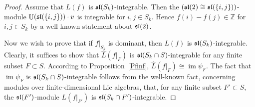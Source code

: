 \documentclass[10pt]{amsart}\oddsidemargin -1mm \evensidemargin -1mm \topmargin -15mm\headheight5mm \headsep 3.5mm \textheight 245mm\textwidth 170mm %
\theoremstyle{definition}\newtheorem{theorem}{Theorem}[section]\newtheorem{lemma}[theorem]{Lemma}\newtheorem{remark}[theorem]{Remark}\newtheorem{proposition}[theorem]{Proposition}\newtheorem{corollary}[theorem]{Corollary}\newtheorem{definition}[theorem]{Definition}\newtheorem{Ex}[theorem]{Example}
\DeclareMathOperator{\Ima}{\mathrm{im}}\DeclareMathOperator{\RS}{\mathrm{RS}}\DeclareMathOperator{\wid}{A}\DeclareMathOperator{\nint}{\alpha}\DeclareMathOperator{\Lfai}{\mathrm{Lfai}}\DeclareMathOperator{\APAut}{\mathrm{Aut}}\DeclareMathOperator{\APcork}{\mathrm{cork}}\DeclareMathOperator{\VAnn}{\mathrm{VAnn}}\DeclareMathOperator{\APrk}{\mathrm{rk}}\DeclareMathOperator{\Sa}{\mathbf{S}}\DeclareMathOperator{\I}{I}\DeclareMathOperator{\Hom}{\mathrm{Hom}}\DeclareMathOperator{\Sh}{\mathrm{Sh}}\DeclareMathOperator{\Q}{\mathrm{Q}}\DeclareMathOperator{\Irr}{\mathrm{Irr}}\DeclareMathOperator{\Ue}{\mathrm{U}}\DeclareMathOperator{\seq}{\mathrm{seq}}\DeclareMathOperator{\tr}{\mathrm{tr}}\DeclareMathOperator{\Ss}{\mathrm{S}}\DeclareMathOperator{\cls}{\mathrm{cls}}\DeclareMathOperator{\Ind}{\mathrm{Ind}}\DeclareMathOperator{\Fss}{\mathrm{FSet}}\DeclareMathOperator{\injo}{\mathrm{inj_0}}\DeclareMathOperator{\Ver}{{\it M}}\DeclareMathOperator{\Adj}{\mathrm{Adj}}\DeclareMathOperator{\APinj}{\mathrm{inj}}\DeclareMathOperator{\Ann}{\mathrm{Ann}}\DeclareMathOperator{\ZAnn}{\mathrm{ZAnn}}\DeclareMathOperator{\ZUe}{\mathrm{ZU}}\DeclareMathOperator{\Var}{\mathrm{Var}}\DeclareMathOperator{\ZVar}{\mathrm{ZVar}}
\newcounter{AP}
\begin{document}
\begin{proof} Assume that $L(f)$ is $\frak{sl}(S_k)$-integrable. Then the $(\frak{sl}(2)\cong\frak{sl}(\{i, j\}))$-module $\Ue(\frak{sl}(\{i, j\}))\cdot v$ is integrable for $i, j\in S_k$. Hence $f(i)-f(j)\in\mathbb Z$ for $i, j\in S_k$ by a well-known statement about $\frak{sl}(2)$.

Now we wish to prove that if $f|_{S_k}$ is dominant, then $L(f)$ is $\frak{sl}(S_k)$-integrable. Clearly, it suffices to show that $\widehat L(f|_F)$ is $\frak{sl}(S_k\cap S)$-integrable for any finite subset $F\subset S$. According to Proposition~\ref{Pfinf}, $\widehat L(f|_F)\cong\Ima\psi_F$. The fact that $\Ima\psi_F$ is $\frak{sl}(S_k\cap S)$-integrable follows from the well-known fact, concerning modules over finite-dimensional Lie algebras, that, for any finite subset $F'\subset S$, the $\frak{sl}(F')$-module $L(f|_{F'})$ is $\frak{sl}(S_k\cap F')$-integrable.






\end{proof}
\end{document}

